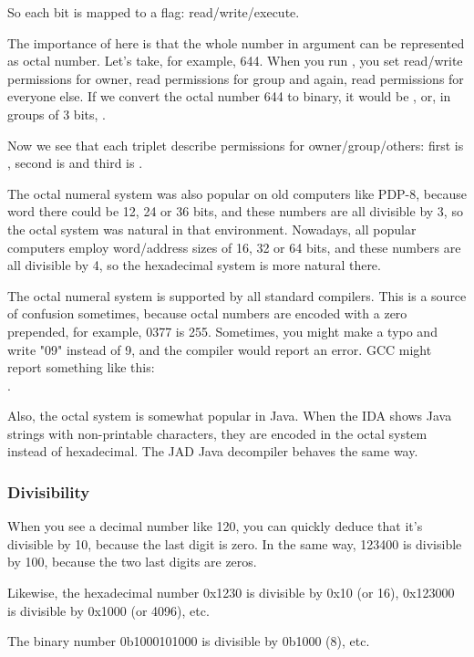 So each bit is mapped to a flag: read/write/execute.

The importance of  here is that the whole number in argument can be represented as octal number.
Let's take, for example, 644.
When you run , you set read/write permissions for owner, read permissions for group and again, read permissions for everyone else.
If we convert the octal number 644 to binary, it would be , or, in groups of 3 bits, .

Now we see that each triplet describe permissions for owner/group/others: first is , second is  and third is .

The octal numeral system was also popular on old computers like PDP-8, because word there could be 12, 24 or 36 bits, and these numbers are all divisible by 3, so the octal system was natural in that environment.
Nowadays, all popular computers employ word/address sizes of 16, 32 or 64 bits, and these numbers are all divisible by 4, so the hexadecimal system is more natural there.

The octal numeral system is supported by all standard \CCpp compilers.
This is a source of confusion sometimes, because octal numbers are encoded with a zero prepended, for example, 0377 is 255.
Sometimes, you might make a typo and write "09" instead of 9, and the compiler would report an error.
GCC might report something like this:\\
.

Also, the octal system is somewhat popular in Java. When the IDA shows Java strings with non-printable characters,
they are encoded in the octal system instead of hexadecimal.
The JAD Java decompiler behaves the same way.

\subsubsection{Divisibility}

When you see a decimal number like 120, you can quickly deduce that it's divisible by 10, because the last digit is zero.
In the same way, 123400 is divisible by 100, because the two last digits are zeros.

Likewise, the hexadecimal number 0x1230 is divisible by 0x10 (or 16), 0x123000 is divisible by 0x1000 (or 4096), etc.

The binary number 0b1000101000 is divisible by 0b1000 (8), etc.


